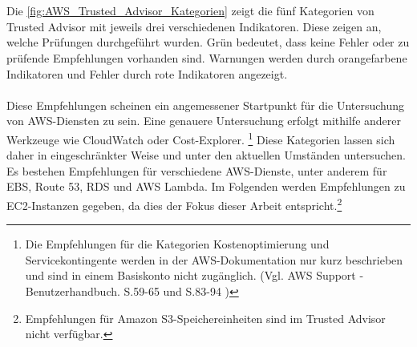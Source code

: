 \\\\
Die \autoref{fig:AWS_Trusted_Advisor_Kategorien} zeigt die fünf Kategorien von Trusted Advisor mit jeweils drei verschiedenen Indikatoren. Diese zeigen an, welche Prüfungen durchgeführt wurden. Grün bedeutet, dass keine Fehler oder zu prüfende Empfehlungen vorhanden sind. Warnungen werden durch orangefarbene Indikatoren und Fehler durch rote Indikatoren angezeigt. 
\\\\
Diese Empfehlungen scheinen ein angemessener Startpunkt für die Untersuchung von AWS-Diensten zu sein. Eine genauere Untersuchung erfolgt mithilfe anderer Werkzeuge wie CloudWatch oder Cost-Explorer. %
\footnote{Die Empfehlungen für die Kategorien Kostenoptimierung und Servicekontingente werden in der AWS-Dokumentation nur kurz beschrieben und sind in einem Basiskonto nicht zugänglich. (Vgl. AWS Support - Benutzerhandbuch. S.59-65 und S.83-94 \cite{AMZ37})} Diese Kategorien lassen sich daher in eingeschränkter Weise und unter den aktuellen Umständen untersuchen.
%
Es bestehen Empfehlungen für verschiedene AWS-Dienste, unter anderem für EBS, Route 53, RDS und AWS Lambda. Im Folgenden werden Empfehlungen zu EC2-Instanzen gegeben, da dies der Fokus dieser Arbeit entspricht.\footnote{Empfehlungen für Amazon S3-Speichereinheiten sind im Trusted Advisor nicht verfügbar.}
